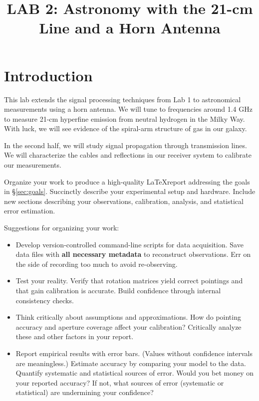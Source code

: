 \documentclass[11pt,preprint]{aastex}
\title {LAB 2: Astronomy with the 21-cm Line and a Horn Antenna}
\date{}
\begin{document}
\maketitle
\tableofcontents

\section{Introduction}

\noindent
This lab extends the signal processing techniques from Lab 1 to astronomical
measurements using a horn antenna.
We will tune to frequencies around 1.4 GHz to measure 21-cm hyperfine emission
from neutral hydrogen in the Milky Way.
With luck, we will see evidence of the spiral-arm structure of gas in our galaxy.

In the second half, we will study signal propagation through transmission lines.
We will characterize the cables and reflections in our receiver system to
calibrate our measurements.

Organize your work to produce a high-quality \LaTeX report addressing the goals in
\S\ref{sec:goals}.
Succinctly describe your experimental setup and hardware.
Include new sections describing your observations, calibration, analysis,
and statistical error estimation.

Suggestions for organizing your work:

\begin{itemize}

    \item Develop version-controlled command-line scripts for data acquisition.
    Save data files with {\bf all necessary metadata} to reconstruct observations.
    Err on the side of recording too much to avoid re-observing.

    \item Test your reality.
    Verify that rotation matrices yield correct pointings and that gain
    calibration is accurate.
    Build confidence through internal consistency checks.

    \item Think critically about assumptions and approximations.
    How do pointing accuracy and aperture coverage affect your calibration?
    Critically analyze these and other factors in your report.

    \item Report empirical results with error bars.
    (Values without confidence intervals are meaningless.)
    Estimate accuracy by comparing your model to the data.
    Quantify systematic and statistical sources of error.
    Would you bet money on your reported accuracy?
    If not, what sources of error (systematic or statistical) are undermining your confidence?

\end{itemize}
\end{document}
